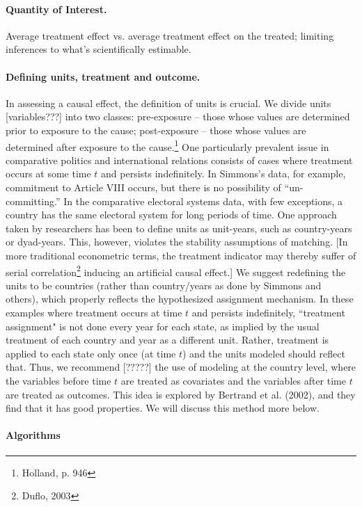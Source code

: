 \documentclass[11pt,titlepage]{article}
\begin{document}
\paragraph{Quantity of Interest.} Average treatment effect vs. average
  treatment effect on the treated; limiting inferences to what's
  scientifically estimable. 
\paragraph{Defining units, treatment and outcome.}  In assessing a
  causal effect, the definition of units is crucial.  
  We divide units [variables???]  into two classes: pre-exposure --
  those whose values are determined prior to exposure to the cause;
  post-exposure -- those whose values are determined after exposure to
  the cause.\footnote{Holland, p. 946}  One particularly prevalent issue
  in comparative politics and international relations consists of
  cases where treatment occurs at some time $t$ and persists
  indefinitely.  In Simmons's data, for example, commitment to Article VIII occurs,
  but there is no possibility of ``un-committing.''  In the
  comparative electoral systems data, with few exceptions, a country
  has the same electoral system for long periods of time.  One
  approach taken by researchers has been to define units as
  unit-years, such as country-years or dyad-years.  This, however, violates the
  stability assumptions of matching. 
  [In more traditional econometric terms, the treatment indicator may
  thereby suffer of serial
  correlation\footnote{Duflo, 2003} inducing an artificial causal
  effect.] We suggest redefining the units to be countries (rather than country/years as done by Simmons and others),
which properly reflects the hypothesized assignment mechanism.  In these examples where treatment occurs at time $t$
and persists indefinitely, ``treatment assignment" is not done every year for each state, as implied by the usual
treatment of each country and year as a different unit.  Rather, treatment is applied to each state only once (at time
$t$) and the units modeled should reflect that.  Thus, we recommend [?????] the use of modeling at the country level, 
where
the variables before time $t$ are treated as covariates and the variables after time $t$ are treated as outcomes.  
This idea is explored by Bertrand et al. (2002), and they find that it has good properties.  We will discuss this
method more below.

\appendix
\paragraph{Algorithms}
\end{document}
